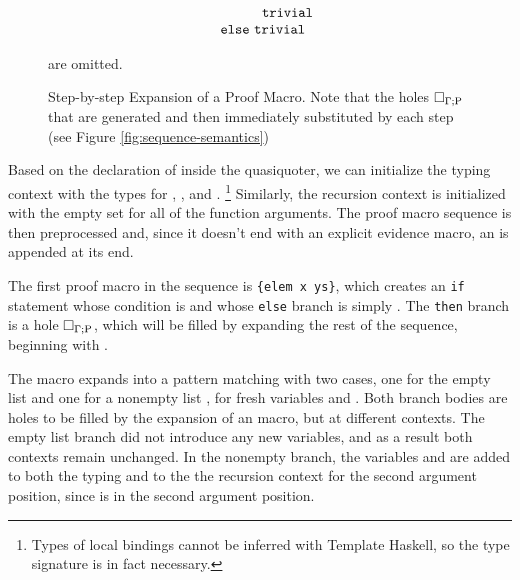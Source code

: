 \begin{figure*}
\begin{minipage}{\textwidth}
\begin{align*}
\begin{array}{rl}
            \\& \hspace{3em} \mathtt{trivial}
        \\& \mathtt{else}~\mathtt{trivial}
    \end{array} \end{align*}
  \end{minipage}
  \caption{Step-by-step Expansion of a Proof Macro. Note that the holes
  $\Box_{\Gamma ; \mathrm{P}}$ that are generated and then immediately substituted
  by each step (see Figure \ref{fig:sequence-semantics})} are omitted.
  \label{fig:step-by-step}
\end{figure*}

Based on the declaration of  inside the quasi\-quoter,
we can initialize the typing context with the types for ,
, and .%
\footnote{Types of local bindings cannot be inferred with Template
  Haskell, so the type signature is in fact necessary.} %
%
Similarly, the recursion context is initialized with the empty set for
all of the function arguments.
%
The proof macro sequence is then preprocessed and, since it doesn't
end with an explicit evidence macro, an   is
appended at its end.

%
The first proof macro in the sequence is  \texttt{\{elem x ys\}},
which creates an \texttt{if} statement whose condition is 
and whose \texttt{else} branch is simply .
%
The \texttt{then} branch is a hole $\Box_{\Gamma ; \mathrm{P}}$, which
will be filled by expanding the rest of the sequence, beginning with
 .

The   macro expands into a pattern matching with
two cases, one for the empty list and one for a nonempty list ,
for fresh variables  and .
%
Both branch bodies are holes to be filled by the expansion of an  macro, but at different contexts.
%
The empty list branch did not introduce any new variables, and as a
result both contexts remain unchanged. In
the nonempty branch, the variables  and  are added to
both the typing and to the the recursion context for the second
argument position, since  is in the second argument position.

